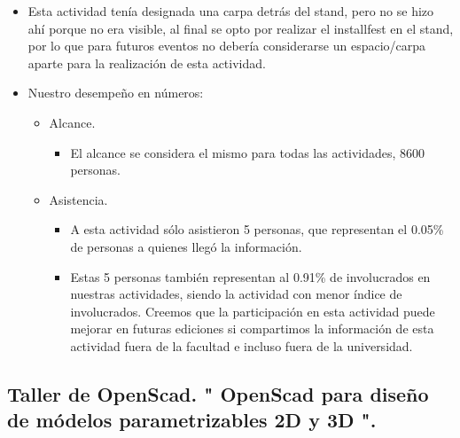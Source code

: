 \documentclass[a4paper,11pt]{article}                 %
\begin{document}
   \begin{itemize}
    \item Esta actividad tenía designada una carpa detrás del stand, pero no se hizo ahí porque no era visible, al final se opto por realizar el installfest en el stand, por lo que para futuros eventos no debería considerarse un espacio/carpa aparte para la realización de esta actividad.
    
    \item Nuestro desempeño en números:
    
    \begin{itemize}
    \item Alcance.
    \begin{itemize}
      \item El alcance se considera el mismo para todas las actividades, 8600 personas.
    \end{itemize}

    \item Asistencia.
    \begin{itemize}
      \item A esta actividad sólo asistieron 5 personas, que representan el 0.05\% de personas a quienes llegó la información.
      \item Estas 5 personas también representan al 0.91\% de involucrados en nuestras actividades, siendo la actividad con menor índice de involucrados. Creemos que la participación en esta actividad puede mejorar en futuras ediciones si compartimos la información de esta actividad fuera de la facultad e incluso fuera de la universidad.
    \end{itemize}
    \end{itemize} 
    
  \end{itemize}
  \subsection{Taller de OpenScad. " {OpenScad} para diseño de módelos parametrizables 2D y 3D ".}
  
\end{document}
